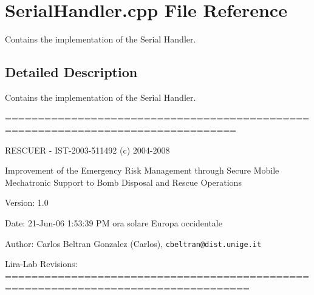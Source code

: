 \section{Serial\-Handler.cpp File Reference}
\label{SerialHandler_8cpp}
Contains the implementation of the Serial Handler.  




\subsection{Detailed Description}
Contains the implementation of the Serial Handler. 

=================================================================================

RESCUER - IST-2003-511492 (c) 2004-2008

Improvement of the Emergency Risk Management through Secure Mobile Mechatronic Support to Bomb Disposal and Rescue Operations

\begin{Desc}
\item[Version:]1.0 \end{Desc}
\begin{Desc}
\item[Date:]21-Jun-06 1:53:39 PM ora solare Europa occidentale \end{Desc}
\begin{Desc}
\item[Author:]Carlos Beltran Gonzalez (Carlos), {\tt cbeltran@dist.unige.it} 

Lira-Lab Revisions: ===================================================================================\end{Desc}
